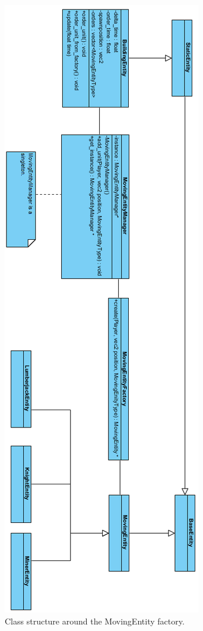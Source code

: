 \begin{figure}
    \centering
    \includegraphics[scale=0.7]{res/MovingEntityFactoryClassRotated.png}
    \caption{Class structure around the MovingEntity factory.}
\end{figure}

